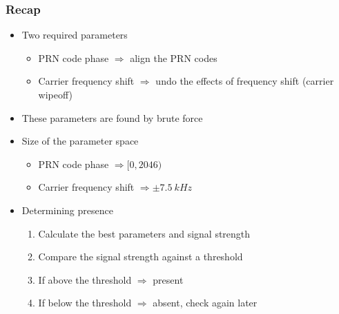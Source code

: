 \documentclass[aspectratio=169]{beamer}
\begin{document}
\begin{frame}
    \frametitle{Recap}

    \begin{itemize}
        \item<2-> Two required parameters
        
        \begin{itemize}
            \item<3-> PRN code phase $\Rightarrow$ align the PRN codes
            
            \item<4-> Carrier frequency shift $\Rightarrow$ undo the effects of frequency shift (carrier wipeoff)
        \end{itemize}

        \item<5-> These parameters are found by brute force
        
        \item<6-> Size of the parameter space
        
        \begin{itemize}
            \item<7-> PRN code phase $\Rightarrow [0, 2046)$
            
            \item<8-> Carrier frequency shift $\Rightarrow \pm \qty{7.5}{kHz}$
        \end{itemize}

        \item<9-> Determining presence

        \begin{enumerate}
            \item<10-> Calculate the best parameters and signal strength
            
            \item<11-> Compare the signal strength against a threshold
            
            \item<12-> If above the threshold $\Rightarrow$ present
            
            \item<13-> If below the threshold $\Rightarrow$ absent, check again later
        \end{enumerate}
    \end{itemize}
\end{frame}
\end{document}
